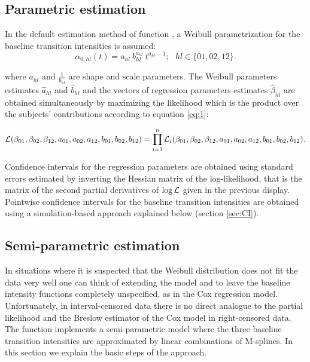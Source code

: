 \documentclass[article]{jss}
\begin{document}
\subsection{Parametric estimation}
\label{sec-3-1}

In the default estimation method of function , a Weibull
parametrization for the baseline transition intensities is assumed: 
\begin{equation*}
\alpha_{0,hl}(t)= a_{hl} ~ b_{hl}^{a_{hl}} ~ t^{a_{hl}-1}; ~~~ hl \in
\{01,02,12\}.
\end{equation*}

where \(a_{hl}\) and \(\frac{1}{b_{hl}}\) are shape and scale
parameters.  The Weibull parameters estimates \(\hat{a}_{hl}\) and \(\hat{b}_{hl}\) and the
vectors of regression parameters estimates \(\hat \beta_{hl}\) are obtained
simultaneously by maximizing the likelihood which is the product over the
subjects' contributions according to equation \ref{eq:1}:


\begin{equation*}
{\cal{L}}(\beta_{01},\beta_{02},\beta_{12},a_{01},a_{02},a_{12},b_{01},b_{02},b_{12})
= \prod_{i=1}^n{\cal{L}}_i(\beta_{01},\beta_{02},\beta_{12},a_{01},a_{02},a_{12},b_{01},b_{02},b_{12}).
\end{equation*}


Confidence intervals for the regression parameters are obtained using
standard errors estimated by inverting the Hessian matrix of the
log-likelihood, that is the matrix of the second partial derivatives
of \(\log{\cal L}\) given in the previous display. Pointwise confidence intervals for
the baseline transition intensities are obtained using a
simulation-based approach explained below (section \ref{sec:CI}).
\subsection{Semi-parametric estimation}
\label{sec-3-2}
\label{sec:semi-para}

In situations where it is suspected that the Weibull distribution does
not fit the data very well one can think of extending the model and to
leave the baseline intensity functions completely unspecified, as in
the Cox regression model. Unfortunately, in interval-censored data
there is no direct analogue to the partial likelihood and the Breslow
estimator of the Cox model in right-censored data. 
The function  implements a
semi-parametric model where the three baseline transition intensities
are approximated by linear combinations of M-splines. In this section
we explain the basic steps of the approach.
\end{document}
